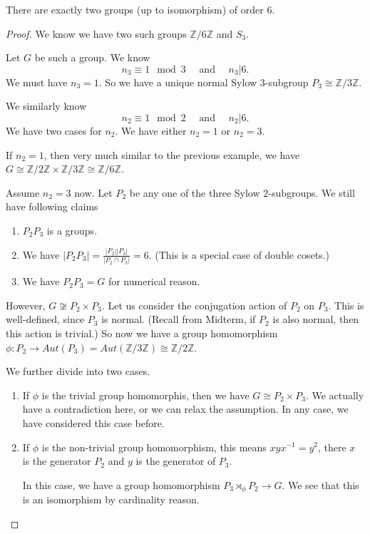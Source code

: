 \begin{prop}
    There are exactly two groups (up to isomorphism) of order $6$.
\end{prop}
\begin{proof}
    We know we have two such groups $\mathbb{Z}/6\mathbb{Z}$ and $S_3$.

    Let $G$ be such a group. We know
    \[
        n_3 \equiv 1 \mod 3 \quad \text{ and } \quad n_3 \vert 6.
    \]
    We must have $n_3 =1$. So we have a unique normal Sylow $3$-subgroup $P_3 \cong \mathbb{Z}/3\mathbb{Z}$.

    We similarly know
    \[
        n_2 \equiv 1 \mod 2 \quad \text{ and } \quad n_2 \vert 6.
    \]
    We have two cases for $n_2$. We have either $n_2 =1$ or $n_2 = 3$.

    If $n_2 =1$, then very much similar to the previous example, we have $G \cong \mathbb{Z}/2\mathbb{Z} \times  \mathbb{Z}/3\mathbb{Z} \cong \mathbb{Z}/6\mathbb{Z}$.

    Assume $n_2 =3$ now. Let $P_2$ be any one of the three Sylow $2$-subgroups. We still have following claims
    \begin{enumerate}
        \item $P_2P_3$ is a groups.
        \item We have $|P_2 P_3| = \frac{|P_2| |P_3|}{ |P_2 \cap P_3|} = 6$. (This is a special case of double cosets.)
        \item We have $P_2 P_3 = G$ for numerical reason.
    \end{enumerate}
    However, $G \not \cong P_2 \times P_3$. Let us consider the conjugation action of $P_2$ on $P_3$. This is well-defined, since $P_3$ is normal. (Recall from Midterm, if $P_2$ is also normal, then this action is trivial.) So now we have a group homomorphism $\phi: P_2 \rightarrow Aut (P_3) = Aut (\mathbb{Z}/3\mathbb{Z}) \cong \mathbb{Z}/2\mathbb{Z}$.

    We further divide into two cases.
    \begin{enumerate}
        \item If $\phi$ is the trivial group homomorphis, then we have $G \cong P_2 \times P_3$. We actually have a contradiction here, or we can relax the assumption. In any case, we have considered this case before.
        \item If $\phi$ is the non-trivial group homomorphism, this means $x y x^{-1}  =y ^2$, there $x$ is the generator $P_2$ and $y$ is the generator of $P_3$.

              In this case, we have a group homomorphism $P_3 \rtimes_\phi P_2 \to G$. We see that this is an isomorphism by cardinality reason.
    \end{enumerate}
\end{proof}


